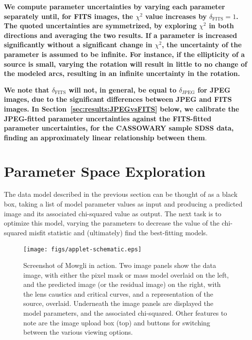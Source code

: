 \documentclass[iop]{emulateapj}
\def\theapplet{{\sc Mowgli}\xspace}
\def\NEW#1{{\bf{#1}}}
\begin{document}
\NEW{We compute parameter uncertainties  by varying each parameter separately
until, for FITS images,  the $\chi^2$ value increases by $\delta_\text{FITS} =
1$. The quoted uncertainties are symmetrized, by exploring $\chi^2$ in both 
directions and averaging the two results. If a parameter is increased
significantly without a significant change in $\chi^2$, the uncertainty of the
parameter is assumed to be infinite. For instance, if the ellipticity of a
source is small, varying the rotation will result in little to no change of
the modeled arcs, resulting in an infinite uncertainty in the rotation.}

\NEW{We note that $\delta_\text{FITS}$ will not, in general,  be equal to
$\delta_\text{JPEG}$ for JPEG images, due to the significant differences
between JPEG and FITS images. In Section~\ref{sec:results:JPEGvsFITS} below,
we calibrate the JPEG-fitted parameter  uncertainties against the FITS-fitted
parameter uncertainties, for the CASSOWARY sample SDSS data, finding an
approximately linear relationship between them}.



\section{Parameter Space Exploration}
\label{sec:explore}

The data model described in the previous section can be thought of as a black
box, taking a list of model parameter values as input and producing a
predicted image and its associated chi-squared value as output. The next task
is to optimize this model, varying the parameters to decrease the value of the
chi-squared misfit statistic and (ultimately) find the best-fitting models. 

\addtocounter{figure}{-1}
\begin{figure}[!ht]
\centering\texttt{[image: figs/applet-schematic.eps]}
\caption{Screenshot of \theapplet in action. Two image panels show the data
image, with either the pixel mask or mass model overlaid on the left, and the
predicted image (or the residual image) on the right, with the lens caustics
and critical curves, and a representation of the source, overlaid. Underneath the image
panels are displayed the model parameters, and the associated chi-squared.
Other features to note are the image upload box (top) and buttons for
switching between the various viewing options.}
\label{fig:screenshot}
\end{figure}
\end{document}
